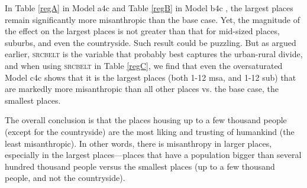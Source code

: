 \documentclass[11pt, letterpaper]{article}
\begin{document}
\begin{spacing}{1.4}
In Table \ref{regA} in Model a4c and Table \ref{regB} in Model b4c%
, the largest places
remain significantly more misanthropic than the base case. Yet, the magnitude of the effect on the largest places is not greater than that for mid-sized places, suburbs, and even the countryside. Such result could be puzzling.
 But as argued earlier, \textsc{srcbelt} is the variable that probably best
 captures the urban-rural divide, and when using \textsc{srcbelt} in Table
 \ref{regC}, we find that even the oversaturated 
 Model c4c shows that it is the largest places (both 1-12 msa, and 1-12 sub) that are markedly more misanthropic than all other places vs. the base case, the smallest places.

 The overall conclusion is that the places housing up to a few thousand people
 (except for the countryside) are the most liking and trusting of humankind (the least
 misanthropic). In other words, there is misanthropy in larger places, especially in the largest places---places that have a population bigger than several hundred thousand people versus the smallest places (up to a few thousand people, and not the countryside).








\end{spacing}
\end{document}
